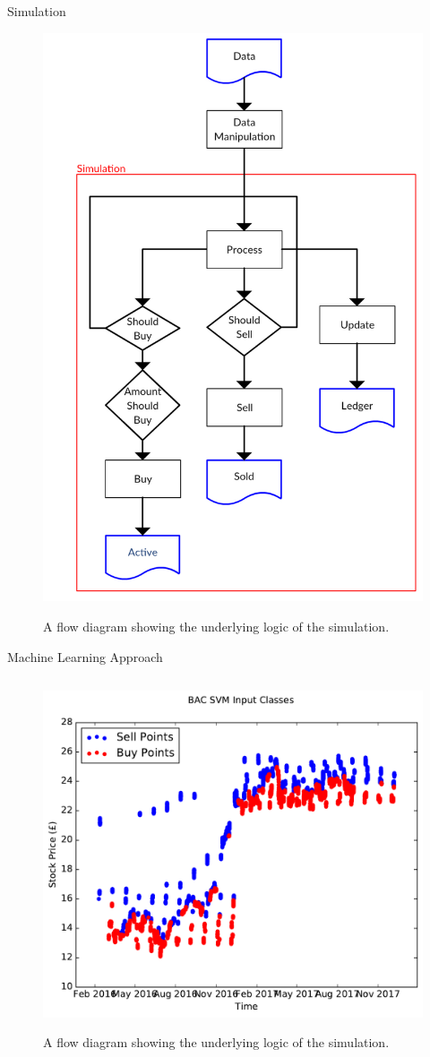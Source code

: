 \documentclass[final]{beamer}
\begin{document}
\begin{frame}{}
\begin{columns}[t]
\begin{column}{.48\linewidth}
        
        \begin{block}{Simulation}
        \begin{figure}
        \centering
		\includegraphics[width=0.4\columnwidth]{simFlow.pdf}
		\label{fig: SimFlow}
		\caption{A flow diagram showing the underlying logic of the simulation.}
		\end{figure}
        \end{block}
        
        
        \begin{block}{Machine Learning Approach}
         
         \begin{columns}[t]
         
         \begin{column}{0.48\linewidth}
         
         \begin{figure}
         \centering
		\includegraphics[width=0.95\columnwidth]{SVMBuyPoints.pdf}
		\label{fig: SVMDataInput}
		\caption{A flow diagram showing the underlying logic of the simulation.}
		\end{figure}
         

\end{column}
\end{columns}
\end{block}
\end{column}
\end{columns}
\end{frame}
\end{document}
